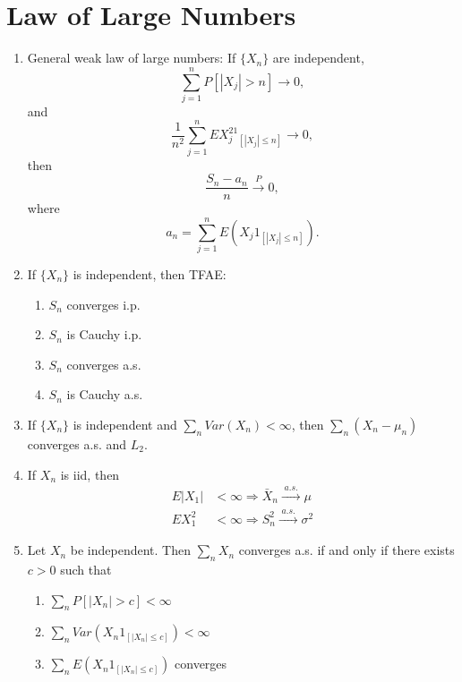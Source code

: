 \documentclass{article}
\newcommand{\as}{\;a.s.\;}
\newcommand{\pto}{\overset{P}{\to}}
\newcommand{\asto}{\overset{\as}{\to}}
\begin{document}
\section{Law of Large Numbers}
\begin{enumerate}
\item General weak law of large numbers: If $\{X_n\}$ are independent,
  \[
    \sum_{j=1}^n P[|X_j| > n] \to 0,
  \]
  and
  \[
    \frac{1}{n^2} \sum_{j=1}^n EX_j^21_{[|X_j| \leq n]} \to 0,
  \]
  then
  \[
    \frac{S_n - a_n}{n} \pto 0,
  \]
  where \[ a_n = \sum_{j=1}^n E(X_j 1_{[|X_j| \leq n]}).
  \]
\item If $\{X_n\}$ is independent, then TFAE:
  \begin{enumerate}
  \item $S_n$ converges i.p.
  \item $S_n$ is Cauchy i.p.
  \item $S_n$ converges a.s.
  \item $S_n$ is Cauchy a.s.
  \end{enumerate}
\item If $\{X_n\}$ is independent and $\sum_n Var(X_n) < \infty$, then
  $\sum_n(X_n - \mu_n)$ converges a.s. and $L_2$.
\item If $X_n$ is iid, then
  \begin{align*}
    E|X_1| & < \infty \Rightarrow \bar{X}_n \asto \mu \\
    EX_1^2 & < \infty \Rightarrow S_n^2 \asto \sigma^2
  \end{align*}
\item Let $X_n$ be independent. Then $\sum_n X_n$ converges a.s. if
  and only if there exists $c > 0$ such that
  \begin{enumerate}
  \item $\sum_n P[|X_n| >c] < \infty$
  \item $\sum_n Var(X_n 1_{[|X_n| \leq c]}) < \infty$
  \item $\sum_n E(X_n 1_{[|X_n| \leq c]})$ converges
  \end{enumerate}
\end{enumerate}
\end{document}
